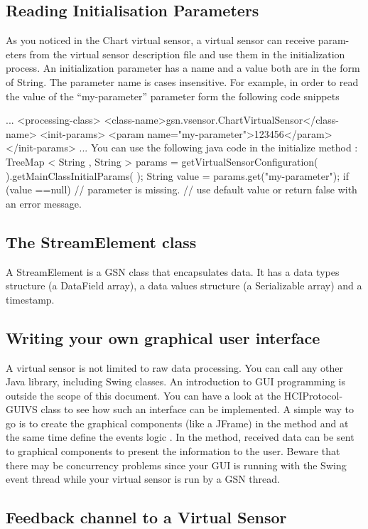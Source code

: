 \subsection{Reading Initialisation Parameters}


As you noticed in the Chart virtual sensor, a virtual sensor can receive param-
eters from the virtual sensor description file and use them in the initialization
process. An initialization parameter has a name and a value both are in the
form of String. The parameter name is cases insensitive.
For example, in order to read the value of the ``my-parameter'' parameter
form the following code snippets

\begin{xmlcode}
...
<processing-class>
<class-name>gsn.vsensor.ChartVirtualSensor</class-name>
<init-params>
<param name="my-parameter">123456</param>
</init-params>
...
You can use the following java code in the initialize method :
TreeMap < String , String > params = getVirtualSensorConfiguration(
).getMainClassInitialParams( );
String value = params.get("my-parameter");
if (value ==null){ // parameter is missing.
// use default value or return false with an error message.
}
\end{xmlcode}

\subsection{The StreamElement class}
A StreamElement is a GSN class that encapsulates data. It has a data types
structure (a DataField array), a data values structure (a Serializable array) and
a timestamp.

\subsection{Writing your own graphical user interface}
A virtual sensor is not limited to raw data processing. You can call any other
Java library, including Swing classes. An introduction to GUI programming is
outside the scope of this document. You can have a look at the HCIProtocol-
GUIVS class to see how such an interface can be implemented.
A simple way to go is to create the graphical components (like a JFrame)
in the  method and at the same time define the events logic
. In the  method, received data can be
sent to graphical components to present the information to the user. Beware
that there may be concurrency problems since your GUI is running with the
Swing event thread while your virtual sensor is run by a GSN thread.


\subsection{Feedback channel to a Virtual Sensor}

